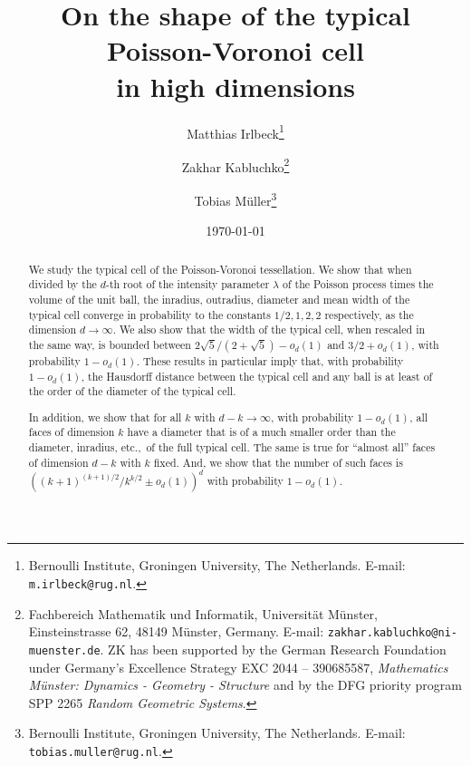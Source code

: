 \documentclass[11pt]{article}%
\begin{document}
\title{On the shape of the typical Poisson-Voronoi cell \\ in high dimensions}


\author{%
Matthias Irlbeck\thanks{Bernoulli Institute, Groningen University, The Netherlands. E-mail: {\tt m.irlbeck@rug.nl}.}
\and
Zakhar Kabluchko\thanks{Fachbereich Mathematik und Informatik, Universit\"{a}t M\"{u}nster, Einsteinstrasse 62, 
48149 M\"{u}nster, Germany. E-mail: {\tt zakhar.kabluchko@ni-muenster.de}. ZK has been supported by the 
German Research Foundation under Germany's Excellence Strategy  EXC 2044 -- 390685587, \textit{Mathematics 
M\"{u}nster: Dynamics - Geometry - Structure} and by the DFG priority 
program SPP 2265 \textit{Random Geometric Systems}.}
\and
Tobias M\"uller\thanks{Bernoulli Institute, Groningen University, The Netherlands. E-mail: {\tt tobias.muller@rug.nl}.} 
}


\date{\today}

\maketitle

\begin{abstract} 
We study the typical cell of the Poisson-Voronoi tessellation.
We show that when divided by the $d$-th root of the intensity parameter $\lambda$ of the Poisson process times
the volume of the unit ball, the inradius, outradius, diameter and mean width of the typical cell converge in 
probability to the constants $1/2, 1, 2, 2$ respectively, as the dimension $d\to\infty$.
We also show that the width of the typical cell, when rescaled in the same way, is bounded between 
$2\sqrt{5}/(2+\sqrt{5})-o_d(1)$ and $3/2+o_d(1)$, with probability $1-o_d(1)$. 
These results in particular imply that, with probability $1-o_d(1)$, the Hausdorff distance between the 
typical cell and any ball is at least of the order of the diameter of the typical cell.

In addition, we show that for all $k$ with $d-k\to\infty$, with probability $1-o_d(1)$, all faces of dimension $k$ 
have a diameter that is of a much smaller 
order than the diameter, inradius, etc.,~of the full typical cell. 
The same is true for ``almost all'' faces of 
dimension $d-k$ with $k$ fixed. And, we show that the number of such faces is 
$\left( (k+1)^{(k+1)/2} / k^{k/2} \pm o_d(1) \right)^d$ with probability $1-o_d(1)$.
\end{abstract}
\end{document}
